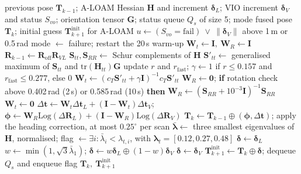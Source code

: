 \documentclass[journal]{IEEEtran}
\begin{document}
\begin{algorithm}[t]
\caption{Fusion node with degeneracy-gated prediction}\label{alg:node}
\footnotesize
\begin{algorithmic}[1]
\Require previous pose $\mathbf T_{k-1}$; A-LOAM Hessian $\mathbf H$ and increment $\boldsymbol\delta_L$; VIO increment $\boldsymbol\delta_V$ and status $S_{vo}$; orientation tensor $\mathbf G$; status queue $Q_s$ of size 5; mode
\Ensure fused pose $\mathbf T_k$; initial guess $\mathbf T^{\mathrm{init}}_{k+1}$ for A-LOAM
\State $u\leftarrow (S_{vo}=\text{fail})\ \vee\ \|\boldsymbol\delta_V\|$ above 1\,m or 0.5\,rad 
 mode $\leftarrow$ failure; restart the 20\,s warm-up \EndIf
{}
  \State $\mathbf W_t\leftarrow\mathbf I,\ \mathbf W_R\leftarrow\mathbf I$ 
\Else
    \State $\mathbf R_{k-1}\leftarrow\mathbf R_{\mathrm{off}}\mathbf R_{VL}$ 
  \EndIf
  \State $\mathbf S_{tt},\mathbf S_{RR}\leftarrow$ Schur complements of $\mathbf H$
  \State $\mathbf S'_{tt}\leftarrow$ generalised maximum of $\mathbf S_{tt}$ and $\mathrm{tr}(\mathbf H_{tt})\mathbf G$ 
  \State update $r$ and $r_{\mathrm{fast}}$; $\gamma\leftarrow 1$ if $r\le0.157$ and $r_{\mathrm{fast}}\le0.277$, else $0$
  \State $\mathbf W_t\leftarrow(c_T\mathbf S'_{tt}+\gamma\mathbf I)^{-1}c_T\mathbf S'_{tt}$ 
  \State $\mathbf W_R\leftarrow\mathbf 0$; \textbf{if} rotation check above 0.402\,rad (2\,s) or 0.585\,rad (10\,s) \textbf{then} $\mathbf W_R\leftarrow(\mathbf S_{RR}+10^{-3}\mathbf I)^{-1}\mathbf S_{RR}$
    \State $\mathbf W_t\leftarrow\mathbf 0$ 
  \EndIf
\EndIf
\State $\Delta\mathbf t\leftarrow\mathbf W_t\Delta\mathbf t_L+(\mathbf I-\mathbf W_t)\Delta\mathbf t_V$;\ $\boldsymbol\phi\leftarrow\mathbf W_R\mathrm{Log}(\Delta\mathbf R_L)+(\mathbf I-\mathbf W_R)\mathrm{Log}(\Delta\mathbf R_V)$
\State $\mathbf T_k\leftarrow\mathbf T_{k-1}\oplus(\boldsymbol\phi,\Delta\mathbf t)$; apply the heading correction, at most $0.25^\circ$ per scan
\State $\bar{\boldsymbol\lambda}\leftarrow$ three smallest eigenvalues of $\mathbf H$, normalised; flag $\leftarrow\exists i:\bar\lambda_i<\lambda_{t,i}$, with $\boldsymbol\lambda_t=[0.12,0.27,0.48]$
  \State $\boldsymbol\delta\leftarrow\boldsymbol\delta_L$ 
  \State $w\leftarrow\min(1,\sqrt3\bar\lambda_1)$; $\boldsymbol\delta\leftarrow w\boldsymbol\delta_L\oplus(1-w)\boldsymbol\delta_V$ 
\Else
  \State $\boldsymbol\delta\leftarrow\boldsymbol\delta_V$ 
\EndIf
\State $\mathbf T^{\mathrm{init}}_{k+1}\leftarrow\mathbf T_k\oplus\boldsymbol\delta$; dequeue $Q_s$ and enqueue flag
\State \Return $\mathbf T_k,\ \mathbf T^{\mathrm{init}}_{k+1}$
\end{algorithmic}
\end{algorithm}
\end{document}

